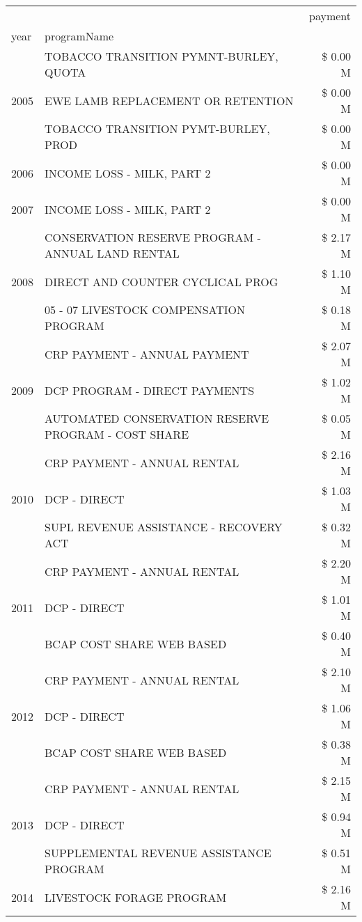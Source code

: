 \begin{tabular}{llr}
\toprule
 &  & payment \\
year & programName &  \\
\midrule
\multirow[t]{3}{*}{2005} & TOBACCO TRANSITION PYMNT-BURLEY, QUOTA & \$ 0.00 M \\
 & EWE LAMB REPLACEMENT OR RETENTION & \$ 0.00 M \\
 & TOBACCO TRANSITION PYMT-BURLEY, PROD & \$ 0.00 M \\
\cline{1-3}
2006 & INCOME LOSS - MILK, PART 2 & \$ 0.00 M \\
\cline{1-3}
2007 & INCOME LOSS - MILK, PART 2 & \$ 0.00 M \\
\cline{1-3}
\multirow[t]{3}{*}{2008} & CONSERVATION RESERVE PROGRAM - ANNUAL LAND RENTAL & \$ 2.17 M \\
 & DIRECT AND COUNTER CYCLICAL PROG & \$ 1.10 M \\
 & 05 - 07 LIVESTOCK COMPENSATION PROGRAM & \$ 0.18 M \\
\cline{1-3}
\multirow[t]{3}{*}{2009} & CRP PAYMENT - ANNUAL PAYMENT & \$ 2.07 M \\
 & DCP PROGRAM - DIRECT PAYMENTS & \$ 1.02 M \\
 & AUTOMATED CONSERVATION RESERVE PROGRAM - COST SHARE & \$ 0.05 M \\
\cline{1-3}
\multirow[t]{3}{*}{2010} & CRP PAYMENT - ANNUAL RENTAL & \$ 2.16 M \\
 & DCP - DIRECT & \$ 1.03 M \\
 & SUPL REVENUE ASSISTANCE - RECOVERY ACT & \$ 0.32 M \\
\cline{1-3}
\multirow[t]{3}{*}{2011} & CRP PAYMENT - ANNUAL RENTAL & \$ 2.20 M \\
 & DCP - DIRECT & \$ 1.01 M \\
 & BCAP COST SHARE WEB BASED & \$ 0.40 M \\
\cline{1-3}
\multirow[t]{3}{*}{2012} & CRP PAYMENT - ANNUAL RENTAL & \$ 2.10 M \\
 & DCP - DIRECT & \$ 1.06 M \\
 & BCAP COST SHARE WEB BASED & \$ 0.38 M \\
\cline{1-3}
\multirow[t]{3}{*}{2013} & CRP PAYMENT - ANNUAL RENTAL & \$ 2.15 M \\
 & DCP - DIRECT & \$ 0.94 M \\
 & SUPPLEMENTAL REVENUE ASSISTANCE PROGRAM & \$ 0.51 M \\
\cline{1-3}
\multirow[t]{3}{*}{2014} & LIVESTOCK FORAGE PROGRAM & \$ 2.16 M \\

\end{tabular}
